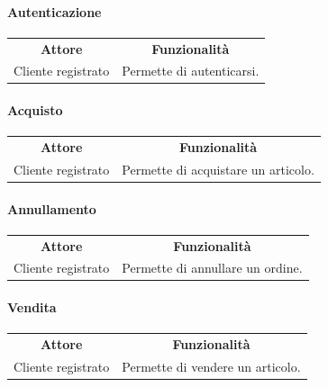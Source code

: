 \documentclass[12pt,a4paper]{article}
\begin{document}
\paragraph*{Autenticazione}
\begin{center}
\begin{tabular}{|c|c|}
\rowcolor[gray]{0.8}
\hline
\textbf{Attore} & \textbf{Funzionalità} \\
Cliente registrato & Permette di autenticarsi. \\
\hline
\end{tabular}
\end{center}

\paragraph*{Acquisto}
\begin{center}
\begin{tabular}{|c|c|}
\rowcolor[gray]{0.8}
\hline
\textbf{Attore} & \textbf{Funzionalità} \\
Cliente registrato & Permette di acquistare un articolo. \\
\hline
\end{tabular}
\end{center}

\paragraph*{Annullamento}
\begin{center}
\begin{tabular}{|c|c|}
\rowcolor[gray]{0.8}
\hline
\textbf{Attore} & \textbf{Funzionalità} \\
Cliente registrato & Permette di annullare un ordine. \\
\hline
\end{tabular}
\end{center}

\paragraph*{Vendita}
\begin{center}
\begin{tabular}{|c|c|}
\rowcolor[gray]{0.8}
\hline
\textbf{Attore} & \textbf{Funzionalità} \\
Cliente registrato & Permette di vendere un articolo. \\
\hline
\end{tabular}
\end{center}
\end{document}
